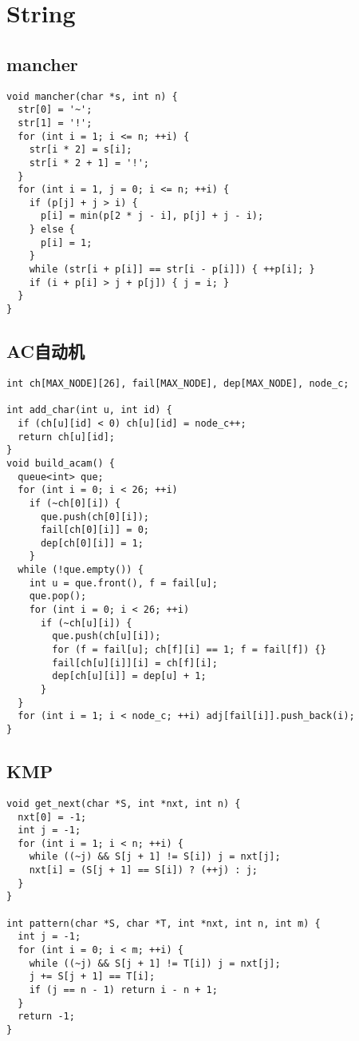 \documentclass[twoside]{article}
\begin{document}
\section{String}

\subsection{mancher}
\begin{lstlisting}
void mancher(char *s, int n) {
  str[0] = '~';
  str[1] = '!';
  for (int i = 1; i <= n; ++i) {
    str[i * 2] = s[i];
    str[i * 2 + 1] = '!';
  }
  for (int i = 1, j = 0; i <= n; ++i) {
    if (p[j] + j > i) {
      p[i] = min(p[2 * j - i], p[j] + j - i);
    } else {
      p[i] = 1;
    }
    while (str[i + p[i]] == str[i - p[i]]) { ++p[i]; }
    if (i + p[i] > j + p[j]) { j = i; }
  }
}

\end{lstlisting}
\subsection{AC自动机}
\begin{lstlisting}
int ch[MAX_NODE][26], fail[MAX_NODE], dep[MAX_NODE], node_c;

int add_char(int u, int id) {
  if (ch[u][id] < 0) ch[u][id] = node_c++;
  return ch[u][id];
}
void build_acam() {
  queue<int> que;
  for (int i = 0; i < 26; ++i)
    if (~ch[0][i]) {
      que.push(ch[0][i]);
      fail[ch[0][i]] = 0;
      dep[ch[0][i]] = 1;
    }
  while (!que.empty()) {
    int u = que.front(), f = fail[u];
    que.pop();
    for (int i = 0; i < 26; ++i)
      if (~ch[u][i]) {
        que.push(ch[u][i]);
        for (f = fail[u]; ch[f][i] == 1; f = fail[f]) {}
        fail[ch[u][i]][i] = ch[f][i];
        dep[ch[u][i]] = dep[u] + 1;
      }
  }
  for (int i = 1; i < node_c; ++i) adj[fail[i]].push_back(i);
}

\end{lstlisting}
\subsection{KMP}
\begin{lstlisting}
void get_next(char *S, int *nxt, int n) {
  nxt[0] = -1;
  int j = -1;
  for (int i = 1; i < n; ++i) {
    while ((~j) && S[j + 1] != S[i]) j = nxt[j];
    nxt[i] = (S[j + 1] == S[i]) ? (++j) : j;
  }
}

int pattern(char *S, char *T, int *nxt, int n, int m) {
  int j = -1;
  for (int i = 0; i < m; ++i) {
    while ((~j) && S[j + 1] != T[i]) j = nxt[j];
    j += S[j + 1] == T[i];
    if (j == n - 1) return i - n + 1;
  }
  return -1;
}

\end{lstlisting}
\end{document}

